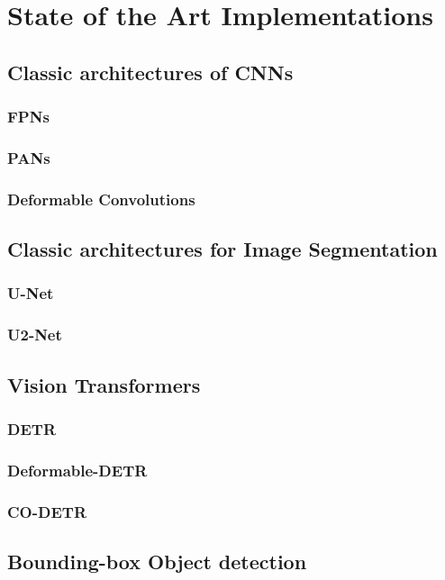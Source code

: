 \documentclass{report} %
\begin{document}
\part{State of the Art Implementations}

\chapter{Classic architectures of CNNs}
\section{FPNs}
\section{PANs}
\section{Deformable Convolutions}

\chapter{Classic architectures for Image Segmentation}
\section{U-Net}
\section{U2-Net}

\chapter{Vision Transformers}
\section{DETR}
\section{Deformable-DETR}
\section{CO-DETR}

\chapter{Bounding-box Object detection}
\end{document}
